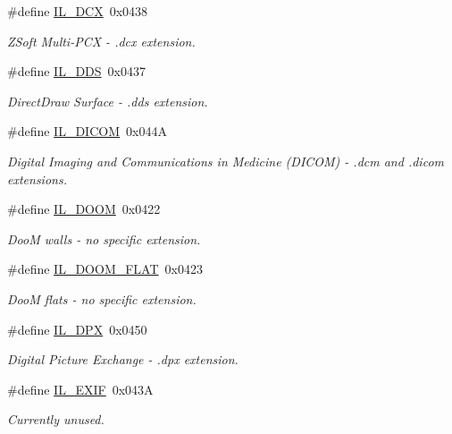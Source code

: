 \begin{DoxyCompactItemize}
\#define \hyperlink{group__il__formats_gabfddb808d8129236744a34eb4bb4216a}{I\+L\+\_\+\+D\+C\+X}~0x0438
\begin{DoxyCompactList}\small\item\em Z\+Soft Multi-\/\+P\+C\+X -\/ .dcx extension. \end{DoxyCompactList}\item 
\#define \hyperlink{group__il__formats_ga737d76763f2c9fb7f25be40130434913}{I\+L\+\_\+\+D\+D\+S}~0x0437
\begin{DoxyCompactList}\small\item\em Direct\+Draw Surface -\/ .dds extension. \end{DoxyCompactList}\item 
\#define \hyperlink{group__il__formats_gac99ded04fa7abc9b5394f99107076be0}{I\+L\+\_\+\+D\+I\+C\+O\+M}~0x044\+A
\begin{DoxyCompactList}\small\item\em Digital Imaging and Communications in Medicine (D\+I\+C\+O\+M) -\/ .dcm and .dicom extensions. \end{DoxyCompactList}\item 
\#define \hyperlink{group__il__formats_gaf3b00e93d3cee92c183ee457c8ce8f2a}{I\+L\+\_\+\+D\+O\+O\+M}~0x0422
\begin{DoxyCompactList}\small\item\em Doo\+M walls -\/ no specific extension. \end{DoxyCompactList}\item 
\#define \hyperlink{group__il__formats_gad0b331e9c40485c339bd0e5698234d89}{I\+L\+\_\+\+D\+O\+O\+M\+\_\+\+F\+L\+A\+T}~0x0423
\begin{DoxyCompactList}\small\item\em Doo\+M flats -\/ no specific extension. \end{DoxyCompactList}\item 
\#define \hyperlink{group__il__formats_gaf725bc72635c3e96eee78d1b8b0b5688}{I\+L\+\_\+\+D\+P\+X}~0x0450
\begin{DoxyCompactList}\small\item\em Digital Picture Exchange -\/ .dpx extension. \end{DoxyCompactList}\item 
\#define \hyperlink{group__il__formats_gad3db25f645aeeb130d702d6e43b128a8}{I\+L\+\_\+\+E\+X\+I\+F}~0x043\+A
\begin{DoxyCompactList}\small\item\em Currently unused. \end{DoxyCompactList}\item 

\end{DoxyCompactItemize}
